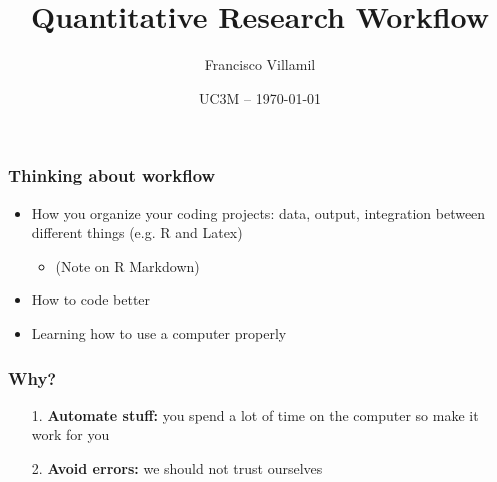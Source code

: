 \documentclass[aspectratio=43]{beamer}
\title[]{\huge Quantitative Research Workflow}
\author[]{Francisco Villamil}
\date[]{UC3M -- \today}
\begin{document}

\begin{frame}
  \titlepage
\end{frame}

\begin{frame}
\frametitle{Thinking about workflow}
\centering

\begin{itemize}
  \item How you organize your coding projects: data, output, integration between different things (e.g. R and Latex)
  \begin{itemize}
    \item (Note on R Markdown)
  \end{itemize}
  \item How to code better
  \item Learning how to use a computer properly
 \end{itemize}

\end{frame}
  

\begin{frame}
\frametitle{Why?}
\centering

\begin{itemize}
  \item[1.] \textbf{Automate stuff:} you spend a lot of time on the computer so make it work for you
  \item[2.] \textbf{Avoid errors:} we should not trust ourselves
\end{itemize}

\end{frame}
\end{document}
